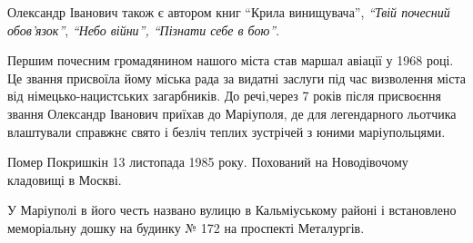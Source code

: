 Олександр Іванович також є автором книг \enquote{Крила винищувача},
\emph{\enquote{Твій почесний обов'язок}}, \emph{\enquote{Небо війни}, \enquote{Пізнати себе
в бою}}.

Першим почесним громадянином нашого міста став маршал авіації у 1968 році. Це
звання присвоїла йому міська рада за видатні заслуги під час визволення міста
від німецько-нацистських загарбників. До речі,через 7 років після присвоєння
звання Олександр Іванович приїхав до Маріуполя, де для легендарного льотчика
влаштували справжнє свято і безліч теплих зустрічей з юними маріупольцями.

Помер Покришкін 13 листопада 1985 року. Похований на Новодівочому кладовищі в
Москві.

У Маріуполі в його честь названо вулицю в Кальміуському районі і встановлено
меморіальну дошку на будинку № 172 на проспекті Металургів.
